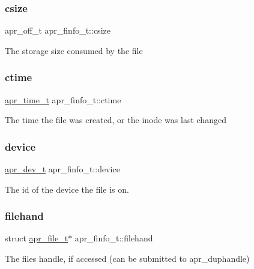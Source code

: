 \subsubsection{\texorpdfstring{csize}{csize}}
{\footnotesize\ttfamily apr\+\_\+off\+\_\+t apr\+\_\+finfo\+\_\+t\+::csize}

The storage size consumed by the file \mbox{\label{structapr__finfo__t_aebbdb3dc755d825de3dce901cfba0883}} 
\subsubsection{\texorpdfstring{ctime}{ctime}}
{\footnotesize\ttfamily \mbox{\hyperlink{group__apr__time_gadb4bde16055748190eae190c55aa02bb}{apr\+\_\+time\+\_\+t}} apr\+\_\+finfo\+\_\+t\+::ctime}

The time the file was created, or the inode was last changed \mbox{\label{structapr__finfo__t_a38cbfbff641284065481f5907d59c8bf}} 
\subsubsection{\texorpdfstring{device}{device}}
{\footnotesize\ttfamily \mbox{\hyperlink{group__apr__file__info_gae2c25c4b679613081599f776efa96c4a}{apr\+\_\+dev\+\_\+t}} apr\+\_\+finfo\+\_\+t\+::device}

The id of the device the file is on. \mbox{\label{structapr__finfo__t_a7858e3d9c5f6ed062d9ff7f5c79b6336}} 
\subsubsection{\texorpdfstring{filehand}{filehand}}
{\footnotesize\ttfamily struct \mbox{\hyperlink{structapr__file__t}{apr\+\_\+file\+\_\+t}}$\ast$ apr\+\_\+finfo\+\_\+t\+::filehand}

The file\textquotesingle{}s handle, if accessed (can be submitted to apr\+\_\+duphandle) \mbox{\label{structapr__finfo__t_a274ae0dd60b59182c2e0134bc9a09a20}} 
